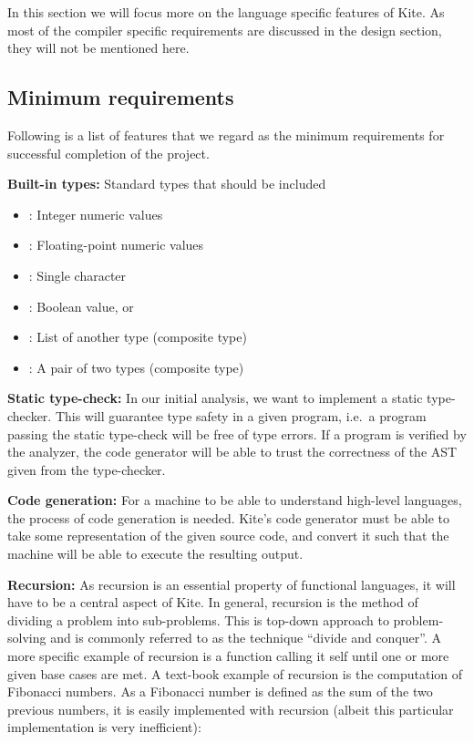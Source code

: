
In this section we will focus more on the language specific features of Kite. As most of the compiler specific requirements are discussed in the design section, they will not be mentioned here.

\subsection{Minimum requirements}
Following is a list of features that we regard as the minimum requirements for successful completion of the project.

\textbf{Built-in types:} Standard types that should be included
\begin{itemize}
\item {}: Integer numeric values
\item {}: Floating-point numeric values
\item {}: Single character
\item {}: Boolean value,  or 
\item {}: List of another type (composite type)
\item {}: A pair of two types (composite type)
\end{itemize}

\textbf{Static type-check:}
In our initial analysis, we want to implement a static type-checker. This will guarantee type safety in a given program, i.e.\ a program passing the static type-check will be free of type errors. If a program is verified by the analyzer, the code generator will be able to trust the correctness of the AST given from the type-checker.

\textbf{Code generation:}
For a machine to be able to understand high-level languages, the process of code generation is needed. Kite's code generator must be able to take some representation of the given source code, and convert it such that the machine will be able to execute the resulting output.

\textbf{Recursion:}
As recursion is an essential property of functional languages, it will have to be a central aspect of Kite. In general, recursion is the method of dividing a problem into sub-problems. This is top-down approach to problem-solving and is commonly referred to as the technique ``divide and conquer''. A more specific example of recursion is a function calling it self until one or more given base cases are met. A text-book example of recursion is the computation of Fibonacci numbers. As a Fibonacci number is defined as the sum of the two previous numbers, it is easily implemented with recursion (albeit this particular implementation is very inefficient):

